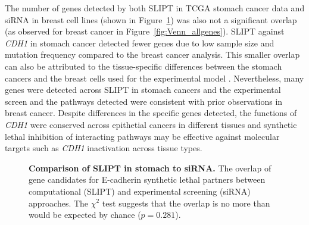 The number of genes detected by both \gls{SLIPT} in \gls{TCGA} stomach cancer data and \gls{siRNA} in breast cell lines (shown in Figure~\ref{fig:Venn_allgenes_stad}) was also not a significant overlap (as observed for breast cancer in Figure~\ref{fig:Venn_allgenes}). %
\gls{SLIPT} against \textit{CDH1} in stomach cancer detected fewer genes due to low sample size and \gls{mutation} frequency compared to the breast cancer analysis.
%
This smaller overlap can also be attributed to the tissue-specific differences between the stomach cancers and the breast cells used for the experimental model \citep{Chen2014}. Nevertheless, many genes were detected across \gls{SLIPT} in stomach cancers and the experimental screen \citep{Telford2015} and the \glspl{pathway} detected were consistent with prior observations in breast cancer. Despite differences in the specific genes detected, the functions of \textit{CDH1} were conserved across epithetial cancers in different tissues and \gls{synthetic lethal} inhibition of interacting \glspl{pathway} may be effective against molecular targets such as \textit{CDH1} inactivation across tissue types.

\begin{figure}[!ht]
  \centering
    \caption[Comparison of SLIPT in stomach to \gls{siRNA}]{\small \textbf{Comparison of SLIPT in stomach to \gls{siRNA}.} The overlap of gene candidates for \gls{E-cadherin} synthetic lethal partners between computational (SLIPT) and experimental screening (siRNA) approaches. The $\chi^2$ test suggests that the overlap is no more than would be expected by chance ($p = 0.281$). %
}
\label{fig:Venn_allgenes_stad}
\end{figure}


